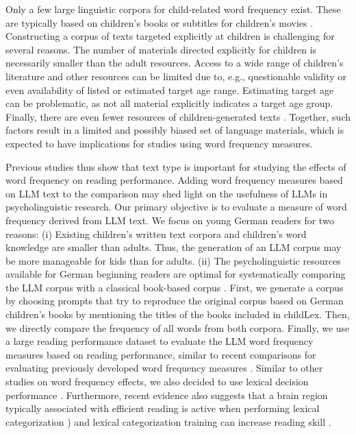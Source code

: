 \documentclass[doc, a4paper]{apa7}
\begin{document}
Only a few large linguistic corpora for child-related word frequency exist. These are typically based on children's books or subtitles for children's movies \citep{schroeder_childlex_2015, tellings_basilex_2014, van_heuven_subtlex-uk_2014, Korochkina_2024}. Constructing a corpus of texts targeted explicitly at children is challenging for several reasons. The number of materials directed explicitly for children is necessarily smaller than the adult resources. Access to a wide range of children's literature and other resources can be limited due to, e.g., questionable validity or even availability of listed or estimated target age range. Estimating target age can be problematic, as not all material explicitly indicates a target age group. Finally, there are even fewer resources of children-generated texts \citep[see, e.g.,][]{laarmann-quante_litkey_2019}. Together, such factors result in a limited and possibly biased set of language materials, which is expected to have implications for studies using word frequency measures. 

Previous studies thus show that text type is important for studying the effects of word frequency on reading performance. Adding word frequency measures based on LLM text to the comparison may shed light on the usefulness of LLMs in psycholinguistic research. Our primary objective is to evaluate a measure of word frequency derived from LLM text. We focus on young German readers for two reasons: (i) Existing children's written text corpora and children's word knowledge are smaller than adults. Thus, the generation of an LLM corpus may be more manageable for kids than for adults. (ii) The psycholinguistic resources available for German beginning readers are optimal for systematically comparing the LLM corpus with a classical book-based corpus \citep[childLex;][]{schroeder_childlex_2015}. First, we generate a corpus by choosing prompts that try to reproduce the original corpus based on German children's books by mentioning the titles of the books included in childLex. Then, we directly compare the frequency of all words from both corpora. Finally, we use a large reading performance dataset \citep[DeveL;][]{schroter_developmental_2017} to evaluate the LLM word frequency measures based on reading performance, similar to recent comparisons for evaluating previously developed word frequency measures \citep[e.g.,][]{brysbaert_word_2011, brysbaert_word_2018}. Similar to other studies on word frequency effects, we also decided to use lexical decision performance \citep[i.e., an often-used classical task, that offers a window into understanding word recognition in children;][]{davies_reading_2017, monster_word_2022, van_den_boer_lexical_2012}. Furthermore, recent evidence also suggests that a brain region typically associated with efficient reading \citep{dehaene_unique_2011} is active when performing lexical categorization \citep[i.e., the process underlying lexical decisions;][]{gagl_lexical_2022}) and lexical categorization training can increase reading skill \citep{gagl_investigating_2023}.
\end{document}
